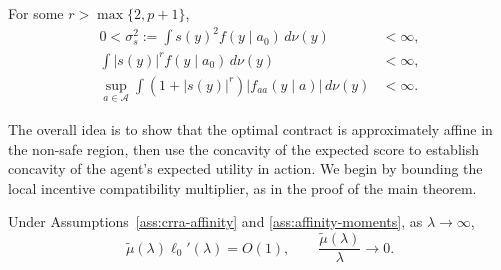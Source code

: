 \documentclass[12pt]{article}
\begin{document}
\begin{assumption}
\label{ass:affinity-moments}
For some $r>\max\{2,p+1\}$,
\begin{align*}
 0<\sigma_s^2:=\int s(y)^2f(y\mid a_0)\,d\nu(y)&<\infty,\\
 \int |s(y)|^r f(y\mid a_0)\,d\nu(y)&<\infty,\\
 \sup_{a\in\mathcal A}\int
 (1+|s(y)|^r)|f_{aa}(y\mid a)|\,d\nu(y)&<\infty.
\end{align*}
\end{assumption}

The overall idea is to show that the optimal contract is approximately affine in the non-safe region, then use the concavity of the expected score to establish concavity of the agent's expected utility in action. We begin by bounding the local incentive compatibility multiplier, as in the proof of the main theorem.

\begin{lemma}
\label{lem:affinity-multiplier}
Under Assumptions~\ref{ass:crra-affinity} and
\ref{ass:affinity-moments}, as $\lambda\to\infty$,
\[
    \widetilde\mu(\lambda)\ell_0'(\lambda)=O(1),
    \qquad
    \frac{\widetilde\mu(\lambda)}{\lambda}\longrightarrow0.
\]
\end{lemma}
\end{document}
